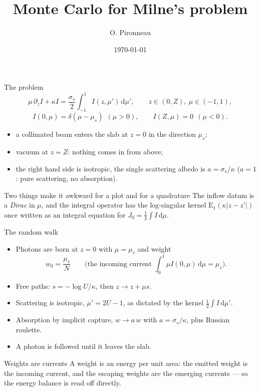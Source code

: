 \documentclass[aspectratio=169,10pt]{beamer}
\title[Monte Carlo for Milne's problem]{Monte Carlo for Milne's problem}
\author{O. Pironneau}
\date{\today}
\renewcommand{\d}{\,\mathrm{d}}
\newcommand{\E}{\mathrm{E}}
\begin{document}
\begin{frame}\titlepage\end{frame}

\begin{frame}{The problem}
\[
\mu\,\partial_z I+\kappa I=\frac{\sigma_s}2\int_{-1}^{1}I(z,\mu')\d\mu',
\qquad z\in(0,Z),\ \mu\in(-1,1),
\]
\[
I(0,\mu)=\delta(\mu-\mu_s)\ \ (\mu>0),\qquad I(Z,\mu)=0\ \ (\mu<0).
\]
\begin{itemize}
\item a collimated beam enters the slab at $z=0$ in the direction $\mu_s$;
\item vacuum at $z=Z$: nothing comes in from above;
\item the right hand side is isotropic, the single scattering albedo is
$a=\sigma_s/\kappa$ ($a=1$: pure scattering, no absorption).
\end{itemize}
\medskip

\begin{block}{Two things make it awkward for a plot and for a quadrature}
The inflow datum is a \emph{Dirac} in $\mu$, and the integral operator has the
log-singular kernel $\E_1(\kappa|z-z'|)$ once written as an integral equation for
$J_0=\frac12\int I\d\mu$.
\end{block}
\end{frame}

\begin{frame}{The random walk}
\begin{itemize}
\item Photons are born at $z=0$ with $\mu=\mu_s$ and weight
\[
w_0=\frac{\mu_s}{N}\qquad\text{(the incoming current }\textstyle\int_0^1\mu I(0,\mu)\d\mu=\mu_s).
\]
\item Free paths: $s=-\log U/\kappa$, then $z\to z+\mu s$.
\item Scattering is isotropic, $\mu'=2U-1$, as dictated by the kernel
$\frac12\int I\d\mu'$.
\item Absorption by implicit capture, $w\to a\,w$ with $a=\sigma_s/\kappa$, plus Russian
roulette.
\item A photon is followed until it leaves the slab.
\end{itemize}
\medskip

\begin{block}{Weights are currents}
A weight is an energy per unit area: the emitted weight is the incoming current, and the
escaping weights are the emerging currents --- so the energy balance is read off directly.
\end{block}
\end{frame}
\end{document}
